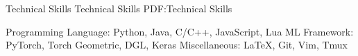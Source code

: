 \Section
{Technical Skills}
{Technical Skills}
{PDF:Technical Skills}

\BulletItem
Programming Language: Python, Java, C/C++, JavaScript, Lua
\Gap
\BulletItem
ML Framework: PyTorch, Torch Geometric, DGL, Keras
\Gap
\BulletItem
Miscellaneous: \LaTeX, Git, Vim, Tmux
